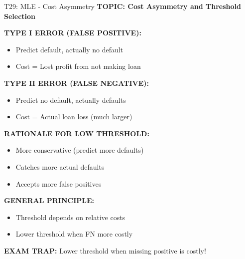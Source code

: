 \documentclass[8pt]{beamer}
\begin{document}
	\begin{frame}{T29: MLE - Cost Asymmetry}
		\fontsize{6.5}{7.5}\selectfont
		\textbf{TOPIC: Cost Asymmetry and Threshold Selection}
		
		\vspace{0.1cm}
		\textbf{TYPE I ERROR (FALSE POSITIVE):}
		\begin{itemize}
			\item Predict default, actually no default
			\item Cost = Lost profit from not making loan
		\end{itemize}
		
		\vspace{0.1cm}
		\textbf{TYPE II ERROR (FALSE NEGATIVE):}
		\begin{itemize}
			\item Predict no default, actually defaults
			\item Cost = Actual loan loss (much larger)
		\end{itemize}
		
		\vspace{0.1cm}
		\textbf{RATIONALE FOR LOW THRESHOLD:}
		\begin{itemize}
			\item More conservative (predict more defaults)
			\item Catches more actual defaults
			\item Accepts more false positives
		\end{itemize}
		
		\vspace{0.1cm}
		\textbf{GENERAL PRINCIPLE:}
		\begin{itemize}
			\item Threshold depends on relative costs
			\item Lower threshold when FN more costly
		\end{itemize}
		
		\textcolor{myred}{\textbf{EXAM TRAP:}} Lower threshold when \textcolor{myblue}{missing positive is costly}!
	\end{frame}
	
\end{document}
